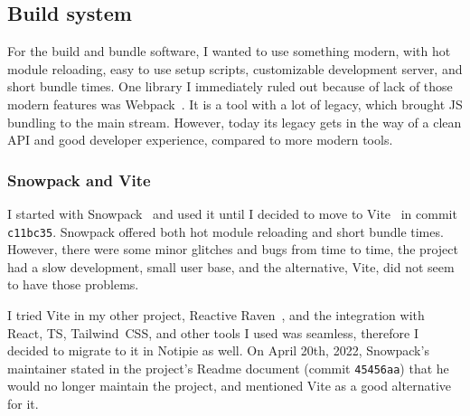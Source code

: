 \subsection{Build system}\label{sec:build-system}

For the build and bundle software,
I wanted to use something modern,
with hot module reloading,
easy to use setup scripts,
customizable development server,
and short bundle times.
One library I immediately ruled out
because of lack of those modern features
was Webpack~\cite{koppers_webpack_2022}.
It is a tool with a lot of legacy,
which brought \ac{JS} bundling to the main stream.
However, today its legacy gets in the way
of a clean \ac{API} and good developer experience,
compared to more modern tools.

\subsubsection{Snowpack and Vite}\label{sec:snowpack-and-vite}

I started with Snowpack~\cite{schott_snowpack_2021}
and used it until I decided to move to Vite~\cite{you_vite_2022}
in commit \texttt{c11bc35}.
Snowpack offered both hot module reloading and short bundle times.
However, there were some minor glitches and bugs from time to time,
the project had a slow development,
small user base,
and the alternative, Vite,
did not seem to have those problems.

I tried Vite in my other project,
Reactive Raven~\cite{sewera_reactive_2022},
and the integration with
React,
\ac{TS},
Tailwind~CSS,
and other tools I used was seamless,
therefore I decided to migrate to it in Notipie as well.
On April 20th, 2022,
Snowpack's maintainer stated in the project's Readme document
(commit \texttt{45456aa})
that he would no longer maintain the project,
and mentioned Vite as a good alternative for it.

